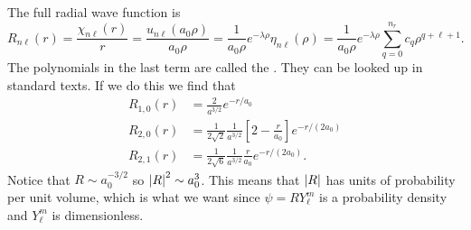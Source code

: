 \documentclass[a4paper]{article}
\theoremstyle{definition}
\begin{document}
    The full radial wave function is
    \[R_{n\ell}(r) = \frac{\chi_{n\ell}(r)}{r} = \frac{u_{n\ell}(a_0\rho)}{a_0\rho} = \frac{1}{a_0\rho}e^{-\lambda\rho}\eta_{n\ell}(\rho) = \frac{1}{a_0\rho}e^{-\lambda\rho}\sum_{q=0}^{n_r} c_q\rho^{q + \ell + 1}.\]
    The polynomials in the last term are called the .
    They can be looked up in standard texts.
    If we do this we find that
    \begin{align*}
        R_{1,0}(r) &= \frac{2}{a^{3/2}}e^{-r/a_0}\\
        R_{2,0}(r) &= \frac{1}{2\sqrt{2}} \frac{1}{a^{3/2}} \left[2 - \frac{r}{a_0}\right] e^{-r/(2a_0)}\\
        R_{2,1}(r) &= \frac{1}{2\sqrt{6}} \frac{1}{a^{3/2}} \frac{r}{a_0} e^{-r/(2a_0)}.
    \end{align*}
    Notice that \(R\sim a_0^{-3/2}\) so \(\abs{R}^2\sim a_0^3\).
    This means that \(\abs{R}\) has units of probability per unit volume, which is what we want since \(\psi = RY_\ell^m\) is a probability density and \(Y_\ell^m\) is dimensionless.
    
\end{document}
